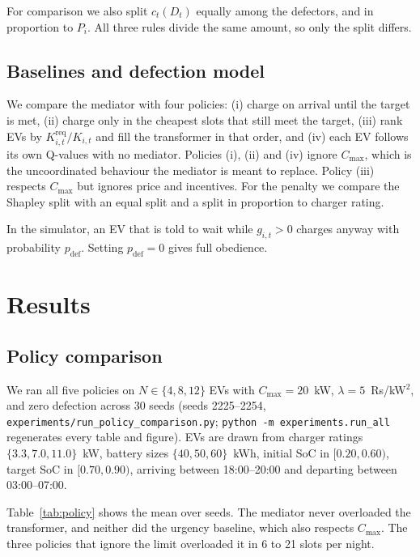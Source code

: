 \documentclass{article}
\newcommand{\cmax}{C_{\max}}
\begin{document}
For comparison we also split $c_t(D_t)$ equally among the defectors, and in proportion to $P_i$. All three rules divide the same amount, so only the split differs.

\subsection{Baselines and defection model}

We compare the mediator with four policies: (i) charge on arrival until the target is met, (ii) charge only in the cheapest slots that still meet the target, (iii) rank EVs by $K^{\mathrm{req}}_{i,t} / K_{i,t}$ and fill the transformer in that order, and (iv) each EV follows its own Q-values with no mediator. Policies (i), (ii) and (iv) ignore $\cmax$, which is the uncoordinated behaviour the mediator is meant to replace. Policy (iii) respects $\cmax$ but ignores price and incentives. For the penalty we compare the Shapley split with an equal split and a split in proportion to charger rating.

In the simulator, an EV that is told to wait while $g_{i,t} > 0$ charges anyway with probability $p_{\mathrm{def}}$. Setting $p_{\mathrm{def}} = 0$ gives full obedience.

\section{Results}

\subsection{Policy comparison}
\label{sec:res-policies}

We ran all five policies on $N \in \{4, 8, 12\}$ EVs with $\cmax = 20$~kW, $\lambda = 5$~Rs/kW$^2$, and zero defection across 30 seeds (seeds 2225--2254, \texttt{experiments/run\_policy\_comparison.py}; \texttt{python -m experiments.run\_all} regenerates every table and figure). EVs are drawn from charger ratings $\{3.3, 7.0, 11.0\}$~kW, battery sizes $\{40, 50, 60\}$~kWh, initial SoC in $[0.20, 0.60)$, target SoC in $[0.70, 0.90)$, arriving between 18:00--20:00 and departing between 03:00--07:00.

Table~\ref{tab:policy} shows the mean over seeds. The mediator never overloaded the transformer, and neither did the urgency baseline, which also respects $\cmax$. The three policies that ignore the limit overloaded it in 6 to 21 slots per night.
\end{document}
